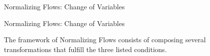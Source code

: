 \documentclass[12pt,ignorenonframetext,]{beamer}
\begin{document}
\begin{frame}{Normalizing Flows: Change of Variables}
\protect\hypertarget{normalizing-flows-change-of-variables-1}{}

\begin{itemize}
\end{itemize}

\end{frame}

\begin{frame}{Normalizing Flows: Change of Variables}
\protect\hypertarget{normalizing-flows-change-of-variables-2}{}

The framework of Normalizing Flows consists of composing several
transformations that fulfill the three listed conditions.

\end{frame}
\end{document}
